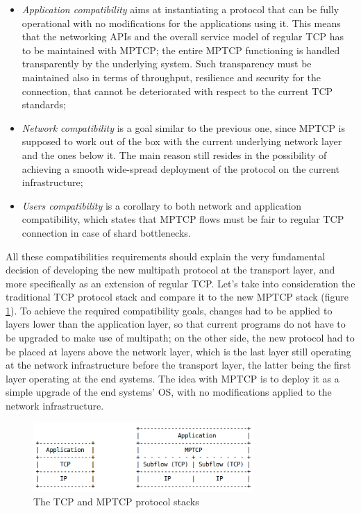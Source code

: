 \begin{itemize}
  \item \textit{Application compatibility} aims at instantiating a protocol that can be fully operational with no modifications for the applications using it. This means that the networking APIs and the overall service model of regular TCP has to be maintained with MPTCP; the entire MPTCP functioning is handled transparently by the underlying system. Such transparency must be maintained also in terms of throughput, resilience and security for the connection, that cannot be deteriorated with respect to the current TCP standards;
  \item \textit{Network compatibility} is a goal similar to the previous one, since MPTCP is supposed to work out of the box with the current underlying network layer and the ones below it. The main reason still resides in the possibility of achieving a smooth wide-spread deployment of the protocol on the current infrastructure;
  \item \textit{Users compatibility} is a corollary to both network and application compatibility, which states that MPTCP flows must be fair to regular TCP connection in case of shard bottlenecks.
\end{itemize}


All these compatibilities requirements should explain the very fundamental decision of developing the new multipath protocol at the transport layer, and more specifically as an extension of regular TCP. Let's take into consideration the traditional TCP protocol stack and compare it to the new MPTCP stack (figure \ref{fig:stack}).
To achieve the required compatibility goals, changes had to be applied to layers lower than the application layer, so that current programs do not have to be upgraded to make use of multipath; on the other side, the new protocol had to be placed at layers above the network layer, which is the last layer still operating at the network infrastructure before the transport layer, the latter being the first layer operating at the end systems. The idea with MPTCP is to deploy it as a simple upgrade of the end systems' OS, with no modifications applied to the network infrastructure.

\begin{figure}[!htb]
\centering
\includegraphics[width=0.75\textwidth]{images/stack}
\caption{The TCP and MPTCP protocol stacks}
\label{fig:stack}
\end{figure}


